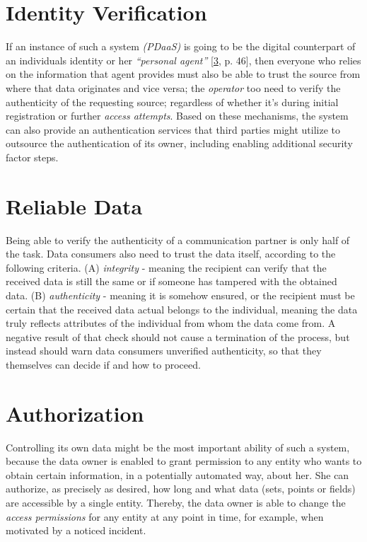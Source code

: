 \documentclass[12pt,english,a4paper,titlepage,cleardoublepage=empty,dottedtoc]{report}
\begin{document}
\section{Identity Verification}\label{identity-verification}

If an instance of such a system \emph{(PDaaS)} is going to be the
digital counterpart of an individuals identity or her \emph{``personal
agent''} {[}\protect\hyperlink{ref-book_2015_ethical-it-innovation}{3},
p. 46{]}, then everyone who relies on the information that agent
provides must also be able to trust the source from where that data
originates and vice versa; the \emph{operator} too need to verify the
authenticity of the requesting source; regardless of whether it's during
initial registration or further \emph{access attempts}. Based on these
mechanisms, the system can also provide an authentication services that
third parties might utilize to outsource the authentication of its
owner, including enabling additional security factor steps.

\section{Reliable Data}\label{reliable-data}

Being able to verify the authenticity of a communication partner is only
half of the task. Data consumers also need to trust the data itself,
according to the following criteria. (A) \emph{integrity} - meaning the
recipient can verify that the received data is still the same or if
someone has tampered with the obtained data. (B) \emph{authenticity} -
meaning it is somehow ensured, or the recipient must be certain that the
received data actual belongs to the individual, meaning the data truly
reflects attributes of the individual from whom the data come from. A
negative result of that check should not cause a termination of the
process, but instead should warn data consumers unverified authenticity,
so that they themselves can decide if and how to proceed.

\section{Authorization}\label{authorization}

Controlling its own data might be the most important ability of such a
system, because the data owner is enabled to grant permission to any
entity who wants to obtain certain information, in a potentially
automated way, about her. She can authorize, as precisely as desired,
how long and what data (sets, points or fields) are accessible by a
single entity. Thereby, the data owner is able to change the
\emph{access permissions} for any entity at any point in time, for
example, when motivated by a noticed incident.
\end{document}
